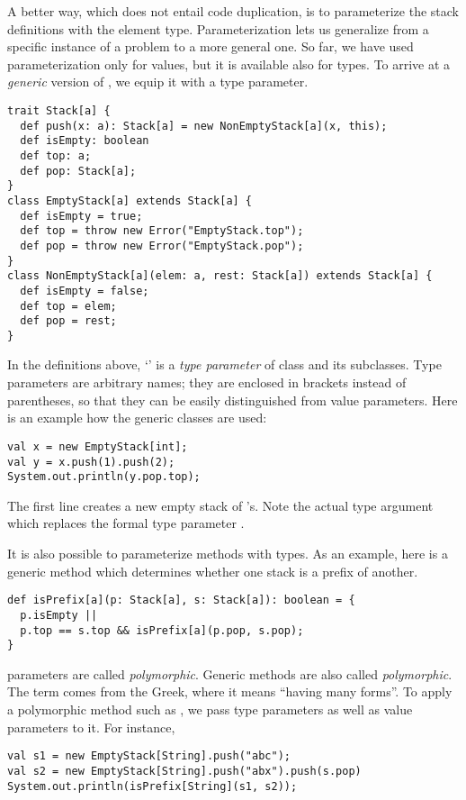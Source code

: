\documentclass[a4paper,12pt,twoside,titlepage]{book}
\begin{document}
A better way, which does not entail code duplication, is to
parameterize the stack definitions with the element type.
Parameterization lets us generalize from a specific instance of a
problem to a more general one. So far, we have used parameterization
only for values, but it is available also for types. To arrive at a
{\em generic} version of , we equip it with a type
parameter.
\begin{lstlisting}
trait Stack[a] {
  def push(x: a): Stack[a] = new NonEmptyStack[a](x, this);
  def isEmpty: boolean
  def top: a;
  def pop: Stack[a];
}
class EmptyStack[a] extends Stack[a] {
  def isEmpty = true;
  def top = throw new Error("EmptyStack.top");
  def pop = throw new Error("EmptyStack.pop");
}
class NonEmptyStack[a](elem: a, rest: Stack[a]) extends Stack[a] {
  def isEmpty = false;
  def top = elem;
  def pop = rest;
}
\end{lstlisting}
In the definitions above, `' is a {\em type parameter} of
class  and its subclasses.  Type parameters are arbitrary
names; they are enclosed in brackets instead of parentheses, so that
they can be easily distinguished from value parameters.  Here is an
example how the generic classes are used:
\begin{lstlisting}
val x = new EmptyStack[int];
val y = x.push(1).push(2);
System.out.println(y.pop.top);
\end{lstlisting}
The first line creates a new empty stack of 's. Note the
actual type argument \code{[int]} which replaces the formal type
parameter .

It is also possible to parameterize methods with types. As an example,
here is a generic method which determines whether one stack is a
prefix of another.
\begin{lstlisting}
def isPrefix[a](p: Stack[a], s: Stack[a]): boolean = {
  p.isEmpty ||
  p.top == s.top && isPrefix[a](p.pop, s.pop);
}
\end{lstlisting}  
parameters are called {\em polymorphic}.  Generic methods are also
called {\em polymorphic}.  The term comes from the Greek, where it
means ``having many forms''.  To apply a polymorphic method such as
, we pass type parameters as well as value parameters
to it. For instance,
\begin{lstlisting}
val s1 = new EmptyStack[String].push("abc");
val s2 = new EmptyStack[String].push("abx").push(s.pop)
System.out.println(isPrefix[String](s1, s2));
\end{lstlisting}
\end{document}
